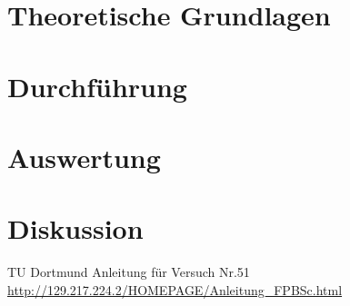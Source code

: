 \newpage					%



\section{Theoretische Grundlagen}
\section{Durchführung}

\section{Auswertung}
\section{Diskussion}


\newpage
 \begin{thebibliography}{WissOnl}
 	 TU Dortmund Anleitung für Versuch Nr.51 \url{http://129.217.224.2/HOMEPAGE/Anleitung_FPBSc.html}
 	\end{thebibliography}





